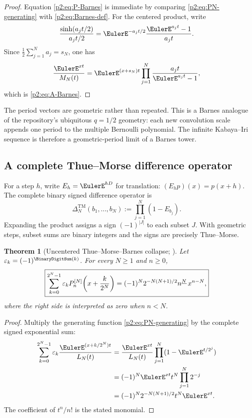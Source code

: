 \documentclass[11pt,oneside]{article}
\numberwithin{equation}{section}
\newtheorem{theorem}{Theorem}[section]
\theoremstyle{definition}
\theoremstyle{remark}
\newcommand{\eps}{\varepsilon}
\begin{document}
\begin{proof}
Equation \eqref{p2:eq:P-Barnes} is immediate by comparing
\eqref{p2:eq:PN-generating} with \eqref{p2:eq:Barnes-def}.  For the centered product, write
\[
 \frac{\sinh(a_jt/2)}{a_jt/2}
 =\EulerE^{-a_jt/2}\frac{\EulerE^{a_jt}-1}{a_jt}.
\]
Since $\frac12\sum_{j=1}^{N}a_j=s_N$, one has
\[
 \frac{\EulerE^{xt}}{M_N(t)}
 =\EulerE^{(x+s_N)t}\prod_{j=1}^{N}\frac{a_jt}{\EulerE^{a_jt}-1},
\]
which is \eqref{p2:eq:A-Barnes}.
\end{proof}

\begin{remark}
The period vectors are geometric rather than repeated.  This is a Barnes analogue of the
repository's ubiquitous $q=1/2$ geometry: each new convolution scale appends one period to the
multiple Bernoulli polynomial.  The infinite Kabaya--Iri sequence is therefore a geometric-period
limit of a Barnes tower.
\end{remark}

\subsection{A complete Thue--Morse difference operator}

For a step $h$, write $E_h=\EulerE^{hD}$ for translation: $(E_hp)(x)=p(x+h)$.  The complete binary
signed difference operator is
\begin{equation}
 \Delta_N^{\mathrm{TM}}(b_1,\ldots,b_N)
 :=\prod_{j=1}^{N}(1-E_{b_j}).
 \label{p2:eq:TM-operator}
\end{equation}
Expanding the product assigns a sign $(-1)^{|J|}$ to each subset $J$.  With geometric steps, subset
sums are binary integers and the signs are precisely Thue--Morse.

\begin{theorem}[Uncentered Thue--Morse--Barnes collapse; \statusnew]
\label{p2:thm:TM-uncentered}
Let $\eps_k=(-1)^{\BinaryDigitSum(k)}$.  For every $N\ge1$ and $n\ge0$,
\begin{equation}
 \boxed{
 \sum_{k=0}^{2^N-1}\eps_k
 P_n^{[N]}\!\left(x+\frac{k}{2^N}\right)
 =(-1)^N2^{-N(N+1)/2}\fall nN\,x^{n-N},
 }
 \label{p2:eq:TM-P-collapse}
\end{equation}
where the right side is interpreted as zero when $n<N$.
\end{theorem}

\begin{proof}
Multiply the generating function \eqref{p2:eq:PN-generating} by the complete signed exponential sum:
\begin{align*}
 \sum_{k=0}^{2^N-1}\eps_k
 \frac{\EulerE^{(x+k/2^N)t}}{L_N(t)}
 &=\frac{\EulerE^{xt}}{L_N(t)}
   \prod_{j=1}^{N}(1-\EulerE^{t/2^j})\\
 &=(-1)^N\EulerE^{xt}t^N\prod_{j=1}^{N}2^{-j}\\
 &=(-1)^N2^{-N(N+1)/2}t^N\EulerE^{xt}.
\end{align*}
The coefficient of $t^n/n!$ is the stated monomial.
\end{proof}
\end{document}
